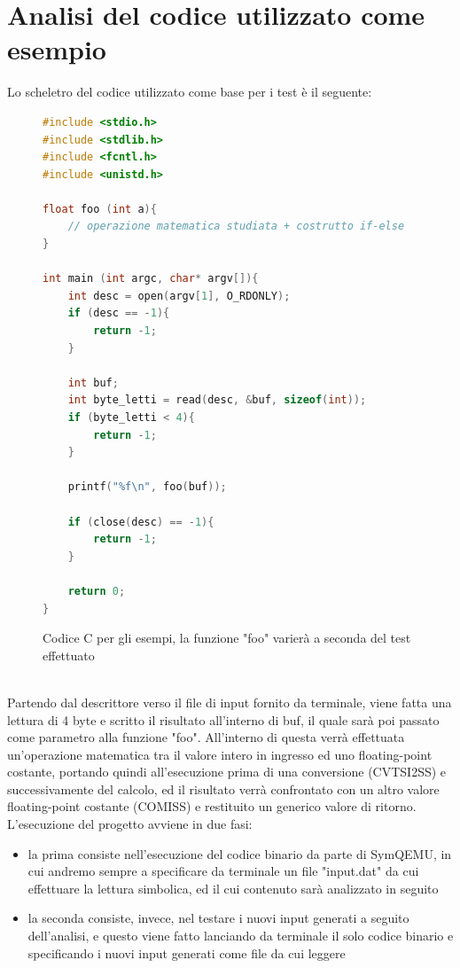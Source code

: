 \documentclass[Lau, oneside]{sapthesis}%
\begin{document}
\section{Analisi del codice utilizzato come esempio}
Lo scheletro del codice utilizzato come base per i test è il seguente:
\begin{figure}[h]
\begin{lstlisting}[xleftmargin=0\textwidth, language=C, basicstyle=\small]
#include <stdio.h>
#include <stdlib.h>
#include <fcntl.h>
#include <unistd.h>

float foo (int a){
    // operazione matematica studiata + costrutto if-else
}

int main (int argc, char* argv[]){
    int desc = open(argv[1], O_RDONLY);
    if (desc == -1){
        return -1;
    }

    int buf;
    int byte_letti = read(desc, &buf, sizeof(int));
    if (byte_letti < 4){
        return -1;
    }

    printf("%f\n", foo(buf));

    if (close(desc) == -1){
        return -1;
    }

    return 0;
}
\end{lstlisting}
    \caption{Codice C per gli esempi, la funzione "foo" varierà a seconda del test effettuato}
    \label{fig:codice_base}
\end{figure}
\ \\ \newline
Partendo dal descrittore verso il file di input fornito da terminale, viene fatta una lettura di 4 byte e scritto il risultato all'interno di buf, il quale sarà poi passato come parametro alla funzione "foo".
\newline
All'interno di questa verrà effettuata un'operazione matematica tra il valore intero in ingresso ed uno floating-point costante, portando quindi all'esecuzione prima di una conversione (CVTSI2SS) e successivamente del calcolo, ed il risultato verrà confrontato con un altro valore floating-point costante (COMISS) e restituito un generico valore di ritorno.
\newline \newline
L'esecuzione del progetto avviene in due fasi:
\begin{itemize}
    \item la prima consiste nell'esecuzione del codice binario da parte di SymQEMU, in cui andremo sempre a specificare da terminale un file "input.dat" da cui effettuare la lettura simbolica, ed il cui contenuto sarà analizzato in seguito
    \item la seconda consiste, invece, nel testare i nuovi input generati a seguito dell'analisi, e questo viene fatto lanciando da terminale il solo codice binario e specificando i nuovi input generati come file da cui leggere
\end{itemize}
\end{document}
